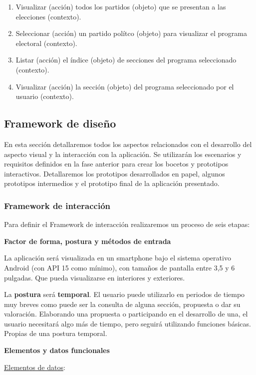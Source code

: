 \begin{enumerate}
\item Visualizar (acción) todos los partidos (objeto) que se presentan a las elecciones (contexto).
\item Seleccionar (acción) un partido polítco (objeto) para visualizar el programa electoral (contexto).
\item Listar (acción) el índice (objeto) de secciones del programa seleccionado (contexto).
\item Visualizar (acción) la sección (objeto) del programa seleccionado por el usuario (contexto).
\end{enumerate}

\subsection{Framework de diseño} \label{ssec:prototypes}

En esta sección detallaremos todos los aspectos relacionados con el desarrollo del aspecto visual y la interacción con la aplicación. Se utilizarán los escenarios y requisitos definidos en la fase anterior para crear los bocetos y prototipos interactivos. Detallaremos los prototipos desarrollados en papel, algunos prototipos intermedios y el prototipo final de la aplicación presentado.

\subsubsection{Framework de interacción}

Para definir el Framework de interacción realizaremos un proceso de seis etapas:

\textbf{Factor de forma, postura y métodos de entrada}

La aplicación será visualizada en un smartphone bajo el sistema operativo Android (con API 15 como mínimo), con tamaños de pantalla entre 3,5 y 6 pulgadas. Que pueda visualizarse en interiores y exteriores.

La \textbf{postura} será \textbf{temporal}. El usuario puede utilizarlo en periodos de tiempo muy breves como puede ser la consulta de alguna sección, propuesta o dar su valoración. Elaborando una propuesta o participando en el desarrollo de una, el usuario necesitará algo más de tiempo, pero seguirá utilizando funciones básicas. Propias de una postura temporal.

\textbf{Elementos y datos funcionales}

\underline{Elementos de datos}:

